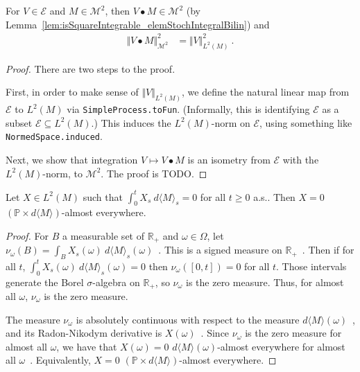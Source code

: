 \begin{lemma}\label{lem:sq_norm_elemStochIntegral}
For $V \in \mathcal{E}$ and $M \in \mathcal{M}^2$, then $V \bullet M \in \mathcal{M}^2$ (by Lemma~\ref{lem:isSquareIntegrable_elemStochIntegralBilin}) and
\begin{align*}
  \Vert V \bullet M \Vert_{\mathcal{M}^2}^2
  &= \Vert V \Vert_{L^2(M)}^2
  \: .
\end{align*}
\end{lemma}

\begin{proof}
  There are two steps to the proof.

  First, in order to make sense of $\Vert V \Vert_{L^2(M)}$,
  we define the natural linear map from $\mathcal{E}$ to $L^2(M)$ via \texttt{SimpleProcess.toFun}.
  (Informally, this is identifying $\mathcal{E}$ as a subset $\mathcal{E} \subseteq L^2(M)$.)
  This induces the $L^2(M)$-norm on $\mathcal{E}$, using something like \texttt{NormedSpace.induced}.

  Next, we show that integration $V \mapsto V \bullet M$ is an isometry from $\mathcal{E}$
  with the $L^2(M)$-norm, to $\mathcal{M}^2$. The proof is TODO.
\end{proof}


\begin{lemma}\label{lem:integral_process_eq_zero}
Let $X\in L^2(M)$ such that $\int_0^t X_s \: d\langle M \rangle_s = 0$ for all $t \ge 0$ a.s.. Then $X = 0$ $(\mathbb{P} \times d\langle M \rangle)$-almost everywhere.
\end{lemma}

\begin{proof}
For $B$ a measurable set of $\mathbb{R}_+$ and $\omega \in \Omega$, let $\nu_\omega(B) = \int_B X_s(\omega) \: d\langle M \rangle_s(\omega)$~. This is a signed measure on $\mathbb{R}_+$~.
Then if for all $t$, $\int_0^t X_s(\omega) \: d\langle M \rangle_s(\omega) = 0$ then $\nu_\omega([0,t]) = 0$ for all $t$.
Those intervals generate the Borel $\sigma$-algebra on $\mathbb{R}_+$, so $\nu_\omega$ is the zero measure.
Thus, for almost all $\omega$, $\nu_\omega$ is the zero measure.

The measure $\nu_\omega$ is absolutely continuous with respect to the measure $d\langle M \rangle(\omega)$~, and its Radon-Nikodym derivative is $X(\omega)$~.
Since $\nu_\omega$ is the zero measure for almost all $\omega$, we have that $X(\omega) = 0$ $d\langle M \rangle(\omega)$-almost everywhere for almost all $\omega$~.
Equivalently, $X = 0$ $(\mathbb{P} \times d\langle M \rangle)$-almost everywhere.
\end{proof}


